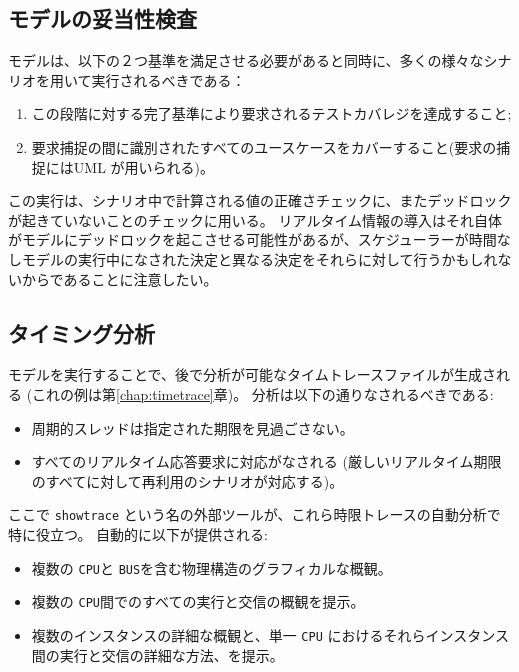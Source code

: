 \documentclass[\pformat,12pt]{jreport}
\begin{document}
\subsection{モデルの妥当性検査}

モデルは、以下の２つ基準を満足させる必要があると同時に、多くの様々なシナリオを用いて実行されるべきである：

\begin{enumerate}
\item この段階に対する完了基準により要求されるテストカバレジを達成すること;
\item 要求捕捉の間に識別されたすべてのユースケースをカバーすること(要求の捕捉にはUML が用いられる)。
\end{enumerate}

この実行は、シナリオ中で計算される値の正確さチェックに、またデッドロックが起きていないことのチェックに用いる。
リアルタイム情報の導入はそれ自体がモデルにデッドロックを起こさせる可能性があるが、スケジューラーが時間なしモデルの実行中になされた決定と異なる決定をそれらに対して行うかもしれないからであることに注意したい。

\subsection{タイミング分析}

モデルを実行することで、後で分析が可能なタイムトレースファイルが生成される (これの例は第\ref{chap:timetrace}章)。 
分析は以下の通りなされるべきである:

\begin{itemize}
\item 周期的スレッドは指定された期限を見過ごさない。
\item すべてのリアルタイム応答要求に対応がなされる (厳しいリアルタイム期限のすべてに対して再利用のシナリオが対応する)。
\end{itemize}

ここで \texttt{showtrace} という名の外部ツールが、これら時限トレースの自動分析で特に役立つ。
自動的に以下が提供される:
\begin{itemize}
\item 複数の \texttt{CPU}と \texttt{BUS}を含む物理構造のグラフィカルな概観。
\item 複数の \texttt{CPU}間でのすべての実行と交信の概観を提示。
\item 複数のインスタンスの詳細な概観と、単一 \texttt{CPU} におけるそれらインスタンス間の実行と交信の詳細な方法、を提示。
\end{itemize}
\end{document}

